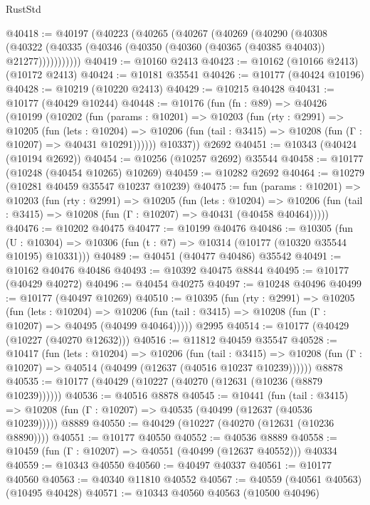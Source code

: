 \begin{lexlean}{RustStd}
\begin{coremodule}
@40418 := @40197
    (@40223
      (@40265
        (@40267
          (@40269
            (@40290
              (@40308
                (@40322 (@40335 (@40346 (@40350 (@40360 (@40365 (@40385 @40403)) @21277)))))))))))
@40419 := @10160 @2413
@40423 := @10162 (@10166 @2413) (@10172 @2413)
@40424 := @10181 @35541
@40426 := @10177 (@40424 @10196)
@40428 := @10219 (@10220 @2413)
@40429 := @10215 @40428
@40431 := @10177 (@40429 @10244)
@40448 := @10176
    (fun (fn : @89) =>
    @40426
      (@10199
        (@10202
          (fun (params : @10201) =>
          @10203
            (fun (rty : @2991) =>
            @10205
              (fun (lets : @10204) =>
              @10206 (fun (tail : @3415) => @10208 (fun (Γ : @10207) => @40431 @10291))))))
        @10337))
    @2692
@40451 := @10343 (@40424 (@10194 @2692))
@40454 := @10256 (@10257 @2692) @35544
@40458 := @10177 (@10248 (@40454 @10265) @10269)
@40459 := @10282 @2692
@40464 := @10279 (@10281 @40459 @35547 @10237 @10239)
@40475 := fun (params : @10201) =>
  @10203
    (fun (rty : @2991) =>
    @10205
      (fun (lets : @10204) =>
      @10206 (fun (tail : @3415) => @10208 (fun (Γ : @10207) => @40431 (@40458 @40464)))))
@40476 := @10202 @40475
@40477 := @10199 @40476
@40486 := @10305
    (fun (U : @10304) => @10306 (fun (t : @7) => @10314 (@10177 (@10320 @35544 @10195) @10331)))
@40489 := @40451 (@40477 @40486) @35542
@40491 := @10162 @40476 @40486
@40493 := @10392 @40475 @8844
@40495 := @10177 (@40429 @40272)
@40496 := @40454 @40275
@40497 := @10248 @40496
@40499 := @10177 (@40497 @10269)
@40510 := @10395
    (fun (rty : @2991) =>
    @10205
      (fun (lets : @10204) =>
      @10206 (fun (tail : @3415) => @10208 (fun (Γ : @10207) => @40495 (@40499 @40464)))))
    @2995
@40514 := @10177 (@40429 (@10227 (@40270 @12632)))
@40516 := @11812 @40459 @35547
@40528 := @10417
    (fun (lets : @10204) =>
    @10206
      (fun (tail : @3415) =>
      @10208 (fun (Γ : @10207) => @40514 (@40499 (@12637 (@40516 @10237 @10239))))))
    @8878
@40535 := @10177 (@40429 (@10227 (@40270 (@12631 (@10236 (@8879 @10239))))))
@40536 := @40516 @8878
@40545 := @10441
    (fun (tail : @3415) => @10208 (fun (Γ : @10207) => @40535 (@40499 (@12637 (@40536 @10239)))))
    @8889
@40550 := @40429 (@10227 (@40270 (@12631 (@10236 @8890))))
@40551 := @10177 @40550
@40552 := @40536 @8889
@40558 := @10459 (fun (Γ : @10207) => @40551 (@40499 (@12637 @40552))) @40334
@40559 := @10343 @40550
@40560 := @40497 @40337
@40561 := @10177 @40560
@40563 := @40340 @11810 @40552
@40567 := @40559 (@40561 @40563) (@10495 @40428)
@40571 := @10343 @40560 @40563 (@10500 @40496)

\end{coremodule}
\end{lexlean}
